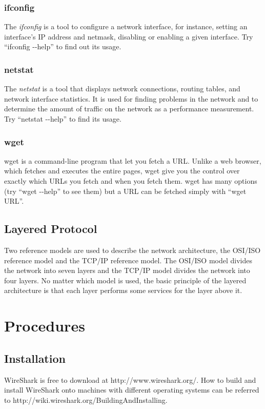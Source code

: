 \subsubsection{ifconfig}
\par The {\em ifconfig} is a tool to configure a network interface, for instance, setting an interface's IP address and netmask,  disabling or enabling a given interface. Try ``ifconfig -\--help'' to find  out its usage.

\subsubsection{netstat}
\par The {\em netstat} is a tool that displays network connections, routing tables, and network interface statistics. It is used for finding problems in the network and to determine the amount of traffic on the network as a performance measurement. Try ``netstat -\--help'' to find its usage.

\subsubsection{wget}
wget is a command-line program that let you fetch a URL. Unlike a web browser, which fetches and executes the entire pages, wget give you the control over exactly which URLs you fetch and when you fetch them. wget has many options (try ``wget -\--help'' to see them) but a URL can be fetched simply with ``wget URL''.

\subsection{Layered Protocol}

Two reference models are used to describe the network architecture, the OSI/ISO reference model and the TCP/IP reference model. The OSI/ISO model divides the network into seven layers and the TCP/IP model divides the network into four layers. No matter which model is used, the basic principle of the layered architecture is that each layer performs some services for the layer above it.

\section{Procedures}

\subsection{Installation}
WireShark is free to download at http://www.wireshark.org/. How to
build and install WireShark onto machines with different operating
systems can be referred to
http://wiki.wireshark.org/BuildingAndInstalling.


